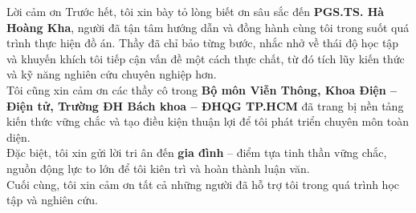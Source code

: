 \begin{frame}{Lời cảm ơn}
\small
Trước hết, tôi xin bày tỏ lòng biết ơn sâu sắc đến 
\textbf{PGS.TS. Hà Hoàng Kha}, người đã tận tâm hướng dẫn và đồng hành cùng tôi 
trong suốt quá trình thực hiện đồ án. Thầy đã chỉ bảo từng bước, nhắc nhở về 
thái độ học tập và khuyến khích tôi tiếp cận vấn đề một cách thực chất, từ đó 
tích lũy kiến thức và kỹ năng nghiên cứu chuyên nghiệp hơn. \\[0.3cm]

Tôi cũng xin cảm ơn các thầy cô trong 
\textbf{Bộ môn Viễn Thông, Khoa Điện – Điện tử, Trường ĐH Bách khoa – ĐHQG TP.HCM} 
đã trang bị nền tảng kiến thức vững chắc và tạo điều kiện thuận lợi để tôi phát triển 
chuyên môn toàn diện. \\[0.3cm]

Đặc biệt, tôi xin gửi lời tri ân đến \textbf{gia đình} – điểm tựa tinh thần vững chắc, 
nguồn động lực to lớn để tôi kiên trì và hoàn thành luận văn. \\[0.3cm]

Cuối cùng, tôi xin cảm ơn tất cả những người đã hỗ trợ tôi trong quá trình học tập và nghiên cứu.
\end{frame}

